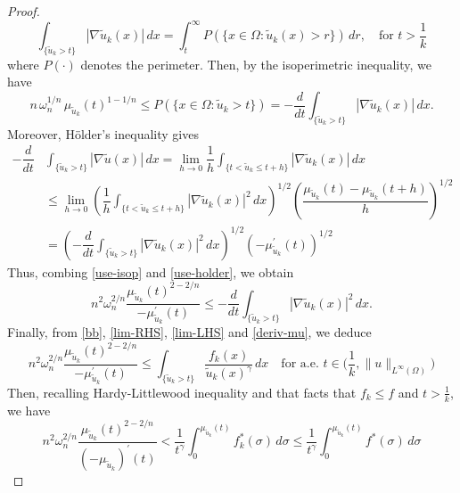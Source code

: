 \documentclass[10pt,a4paper]{amsart}
\begin{document}
\begin{proof}
$$
\int_{\{\tilde u_k>t\}}|\nabla \tilde u_k(x)| \,dx=\int_t^{\infty} P(\{x \in \Omega: \tilde u_k(x)>r\}) \,d r, \quad \text{for } t>\frac{1}{k}
$$
where $P(\cdot)$ denotes the perimeter. Then, by the isoperimetric inequality, we have
\begin{equation}\label{use-isop}
n \,\omega_n^{1/n}\, \mu_{\tilde u_k}(t)^{1-1/n} \leq P(\{x \in \Omega: \tilde u_k>t\})=-\frac{d}{d t} \int_{\{\tilde u_k>t\}}|\nabla \tilde u_k(x)| \,dx .
\end{equation}
Moreover, H\"older's inequality gives
\begin{equation}\label{use-holder}
\begin{aligned}
-\dfrac{d}{d t}& \int_{\{\tilde u_k>t\}}|\nabla \tilde u(x)| \,dx  =\lim _{h \rightarrow 0} \dfrac{1}{h} \int_{\{t<\tilde u_k \leq t+h\}}|\nabla \tilde u_k(x)| \,dx \\
& \leq \lim _{h \rightarrow 0}\left(\dfrac{1}{h} \int_{\{t<\tilde u_k \leq t+h\}}|\nabla \tilde u_k(x)|^2 \,dx\right)^{1 /2}\left(\dfrac{\mu_{\tilde u_k}(t)-\mu_{\tilde u_k}(t+h)}{h}\right)^{1/2} \\
& =\left(-\dfrac{d}{d t} \int_{\{\tilde u_k>t\}}|\nabla \tilde u_k(x)|^2 \,d x\right)^{1 / 2} \left(-\mu_{\tilde u_k}^{\prime}(t)\right)^{1 /2}
\end{aligned}
\end{equation}
Thus, combing \eqref{use-isop} and \eqref{use-holder}, we obtain
\begin{equation}\label{deriv-mu}
n^2\omega_n^{2/n} \dfrac{\mu_{\tilde u_k}(t)^{2-2/n}}{-\mu_{\tilde u_k}^{\prime}(t)} \leq -\frac{d}{d t} \int_{\{\tilde u_k>t\}}|\nabla \tilde u_k(x)|^2 \,d x.
\end{equation}
Finally, from \eqref{bb}, \eqref{lim-RHS}, \eqref{lim-LHS} and \eqref{deriv-mu}, we deduce
\begin{equation}\label{ineq-u-k}
    n^2\omega_n^{2/n} \dfrac{\mu_{\tilde u_k}(t)^{2-2/n}}{-\mu_{\tilde u_k}^{\prime}(t)} \leq \int_{\{\tilde  u_k>t\}}\dfrac{f_k(x)}{\tilde u_k(x)^\gamma}\,dx\quad \text{for a.e. }t\in\Big(\frac{1}{k},\|u\|_{L^\infty(\Omega)}\Big)
\end{equation}
Then, recalling Hardy-Littlewood inequality and 
that facts that $f_k \leq f$ and $t>\frac 1k$, we have
$$
n^2 \omega_n^{2 / n} \frac{\mu_{\tilde{u}_k}(t)^{2-2 / n}}{\left(-\mu_{\tilde{u}_k}\right)^{\prime}(t)} %
<\frac{1}{t^\gamma} \int_0^{\mu_{\tilde{u}_k}(t)} f_k^\ast(\sigma) \,d \sigma 
\leq \frac{1}{t^\gamma} \int_0^{\mu_{\tilde{u}_k}(t)} f^\ast(\sigma) \,d \sigma
$$
\end{proof}
\end{document}
